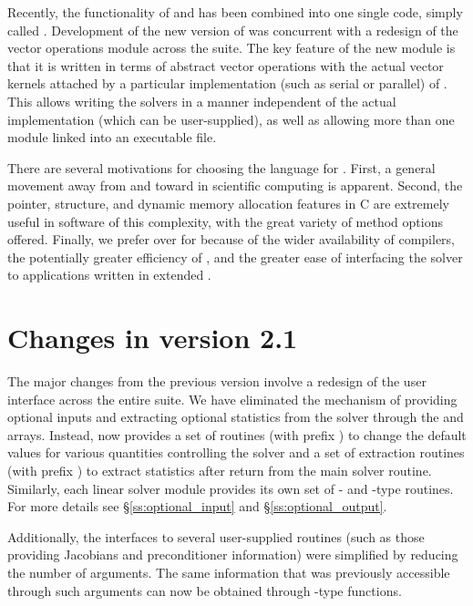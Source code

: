 Recently, the functionality of {\cvode} and {\pvode} has been combined into
one single code, simply called {\cvode}.
Development of the new version of {\cvode} was concurrent with a redesign of the vector operations module
across the {\sundials} suite. The key feature of the new {\nvector} module is that it
is written in terms of abstract vector operations with the actual vector kernels attached
by a particular implementation (such as serial or parallel) of {\nvector}. This allows
writing the {\sundials} solvers in a manner independent of the actual {\nvector} 
implementation (which can be user-supplied), as well as allowing more than one 
{\nvector} module linked into an executable file.

There are several motivations for choosing the {\C} language for {\cvode}.
First, a general movement away from {\F} and toward {\C} in scientific
computing is apparent.  Second, the pointer, structure, and dynamic
memory allocation features in C are extremely useful in software of
this complexity, with the great variety of method options offered.
Finally, we prefer {\C} over {\CPP} for {\cvode} because of the wider
availability of {\C} compilers, the potentially greater efficiency of {\C},
and the greater ease of interfacing the solver to applications written
in extended {\F}.

\section{Changes in version 2.1}
The major changes from the previous version involve a redesign of the
user interface across the entire {\sundials} suite. We have eliminated the
mechanism of providing optional inputs and extracting optional statistics 
from the solver through the  and  arrays. Instead,
{\cvode} now provides a set of routines (with prefix )
to change the default values for various quantities controlling the
solver and a set of extraction routines (with prefix )
to extract statistics after return from the main solver routine.
Similarly, each linear solver module provides its own set of {-}
and {-type} routines. For more details see \S\ref{ss:optional_input}
and \S\ref{ss:optional_output}.

Additionally, the interfaces to several user-supplied routines
(such as those providing Jacobians and preconditioner information) 
were simplified by reducing the number
of arguments. The same information that was previously accessible
through such arguments can now be obtained through {-type}
functions.


